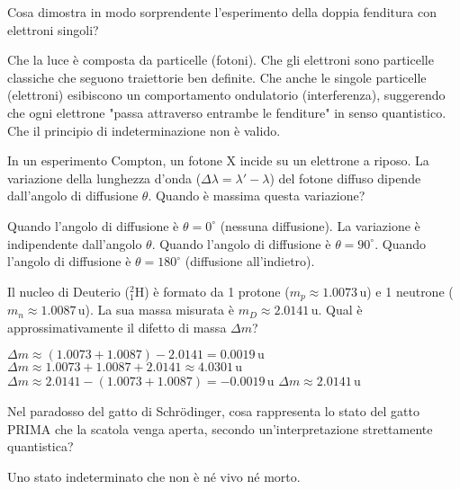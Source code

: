 \documentclass{exam}%
\begin{document}
\begin{questions}%
\question Cosa dimostra in modo sorprendente l'esperimento della doppia fenditura con elettroni singoli?%
\vspace{0.2em}%
\begin{choices}%
\choice Che la luce è composta da particelle (fotoni).%
\choice Che gli elettroni sono particelle classiche che seguono traiettorie ben definite.%
\choice Che anche le singole particelle (elettroni) esibiscono un comportamento ondulatorio (interferenza), suggerendo che ogni elettrone "passa attraverso entrambe le fenditure" in senso quantistico.%
\choice Che il principio di indeterminazione non è valido.%
\end{choices}%
\question In un esperimento Compton, un fotone X incide su un elettrone a riposo. La variazione della lunghezza d'onda ($\Delta \lambda = \lambda' - \lambda$) del fotone diffuso dipende dall'angolo di diffusione $\theta$. Quando è massima questa variazione?%
\vspace{0.2em}%
\begin{choices}%
\choice Quando l'angolo di diffusione è $\theta = 0^\circ$ (nessuna diffusione).%
\choice La variazione è indipendente dall'angolo $\theta$.%
\choice Quando l'angolo di diffusione è $\theta = 90^\circ$.%
\choice Quando l'angolo di diffusione è $\theta = 180^\circ$ (diffusione all'indietro).%
\end{choices}%
\question Il nucleo di Deuterio ($^2_1\text{H}$) è formato da 1 protone ($m_p \approx 1.0073 \, \text{u}$) e 1 neutrone ($m_n \approx 1.0087 \, \text{u}$). La sua massa misurata è $m_D \approx 2.0141 \, \text{u}$. Qual è approssimativamente il difetto di massa $\Delta m$?%
\vspace{0.2em}%
\begin{multicols}{2}%
\begin{choices}%
\choice $\Delta m \approx (1.0073 + 1.0087) - 2.0141 = 0.0019 \, \text{u}$%
\choice $\Delta m \approx 1.0073 + 1.0087 + 2.0141 \approx 4.0301 \, \text{u}$%
\choice $\Delta m \approx 2.0141 - (1.0073 + 1.0087) = -0.0019 \, \text{u}$%
\choice $\Delta m \approx 2.0141 \, \text{u}$%
\end{choices}%
\end{multicols}%
\question Nel paradosso del gatto di Schrödinger, cosa rappresenta lo stato del gatto PRIMA che la scatola venga aperta, secondo un'interpretazione strettamente quantistica?%
\vspace{0.2em}%
\begin{choices}%
\choice Uno stato indeterminato che non è né vivo né morto.%

\end{choices}
\end{questions}
\end{document}
